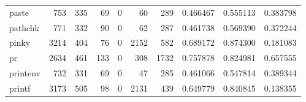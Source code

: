 \begin{longtable}{lrrrrrrrrr}
paste     &                                                753 &                                                335 &                                                 69 &                                                  0 &                                                 60 &                                                289 &                                           0.466467 &                               0.555113 &                             0.383798 \\
pathchk   &                                                771 &                                                332 &                                                 90 &                                                  0 &                                                 62 &                                                287 &                                           0.461738 &                               0.569390 &                             0.372244 \\
pinky     &                                               3214 &                                                404 &                                                 76 &                                                  0 &                                               2152 &                                                582 &                                           0.689172 &                               0.874300 &                             0.181083 \\
pr        &                                               2634 &                                                461 &                                                133 &                                                  0 &                                                308 &                                               1732 &                                           0.757878 &                               0.824981 &                             0.657555 \\
printenv  &                                                732 &                                                331 &                                                 69 &                                                  0 &                                                 47 &                                                285 &                                           0.461066 &                               0.547814 &                             0.389344 \\
printf    &                                               3173 &                                                505 &                                                 98 &                                                  0 &                                               2131 &                                                439 &                                           0.649779 &                               0.840845 &                             0.138355 \\

\end{longtable}
